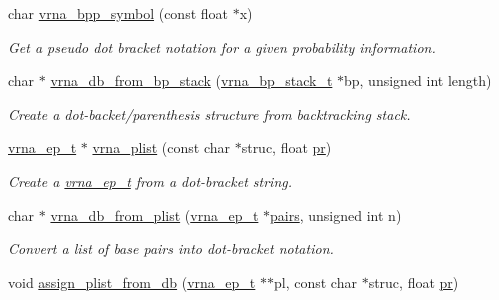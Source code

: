 \begin{DoxyCompactItemize}
\mbox{\label{group__struct__utils_ga025bff1b27fa46534c8fae6980f64bb5}} 
char \hyperlink{group__struct__utils_ga025bff1b27fa46534c8fae6980f64bb5}{vrna\+\_\+bpp\+\_\+symbol} (const float $\ast$x)
\begin{DoxyCompactList}\small\item\em Get a pseudo dot bracket notation for a given probability information. \end{DoxyCompactList}\item 
char $\ast$ \hyperlink{group__struct__utils_ga27bea2c241564af53a065982183389df}{vrna\+\_\+db\+\_\+from\+\_\+bp\+\_\+stack} (\hyperlink{group__data__structures_gaa651bda42e7692f08cb603cd6834b0ee}{vrna\+\_\+bp\+\_\+stack\+\_\+t} $\ast$bp, unsigned int length)
\begin{DoxyCompactList}\small\item\em Create a dot-\/backet/parenthesis structure from backtracking stack. \end{DoxyCompactList}\item 
\hyperlink{group__struct__utils_gab9ac98ab55ded9fb90043b024b915aca}{vrna\+\_\+ep\+\_\+t} $\ast$ \hyperlink{group__struct__utils_gaf002d69024d709744664a8b9ca3dd77d}{vrna\+\_\+plist} (const char $\ast$struc, float \hyperlink{fold__vars_8h_ac98ec419070aee6831b44e5c700f090f}{pr})
\begin{DoxyCompactList}\small\item\em Create a \hyperlink{group__struct__utils_gab9ac98ab55ded9fb90043b024b915aca}{vrna\+\_\+ep\+\_\+t} from a dot-\/bracket string. \end{DoxyCompactList}\item 
char $\ast$ \hyperlink{group__struct__utils_ga6a51a36b9245d0bac868c5cd172b9611}{vrna\+\_\+db\+\_\+from\+\_\+plist} (\hyperlink{group__struct__utils_gab9ac98ab55ded9fb90043b024b915aca}{vrna\+\_\+ep\+\_\+t} $\ast$\hyperlink{group__struct__utils_ga6341cbb704924824e0236c1dce791032}{pairs}, unsigned int n)
\begin{DoxyCompactList}\small\item\em Convert a list of base pairs into dot-\/bracket notation. \end{DoxyCompactList}\item 
void \hyperlink{group__struct__utils_gab61df77cf7949cd516181fce0c3d7d78}{assign\+\_\+plist\+\_\+from\+\_\+db} (\hyperlink{group__struct__utils_gab9ac98ab55ded9fb90043b024b915aca}{vrna\+\_\+ep\+\_\+t} $\ast$$\ast$pl, const char $\ast$struc, float \hyperlink{fold__vars_8h_ac98ec419070aee6831b44e5c700f090f}{pr})
$$
\end{DoxyCompactItemize}
